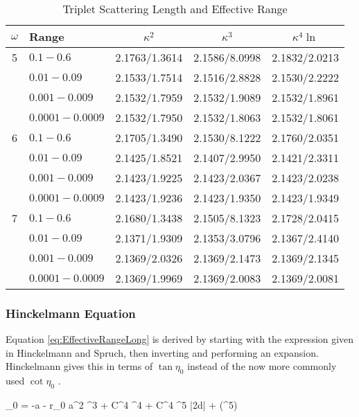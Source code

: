 \documentclass[Dissertation.tex]{subfiles}
\begin{document}
\begin{table}[H]
\centering
\begin{tabular}{c l c c c}
\toprule
$\omega$ & Range & $\kappa^2$ & $\kappa^3$ & $\kappa^4 \ln$ \\
\midrule
5 & $0.1 - 0.6$ & 2.1763/1.3614 & 2.1586/8.0998 & 2.1832/2.0213 \\
  & $0.01 - 0.09$ & 2.1533/1.7514 & 2.1516/2.8828 & 2.1530/2.2222 \\
  & $0.001 - 0.009$ & 2.1532/1.7959 & 2.1532/1.9089 & 2.1532/1.8961 \\
  & $0.0001 - 0.0009$ & 2.1532/1.7950 & 2.1532/1.8063 & 2.1532/1.8061 \\
\midrule
6 & $0.1 - 0.6$ & 2.1705/1.3490 & 2.1530/8.1222 & 2.1760/2.0351 \\
  & $0.01 - 0.09$ & 2.1425/1.8521 & 2.1407/2.9950 & 2.1421/2.3311 \\
  & $0.001 - 0.009$ & 2.1423/1.9225 & 2.1423/2.0367 & 2.1423/2.0238 \\
  & $0.0001 - 0.0009$ & 2.1423/1.9236 & 2.1423/1.9350 & 2.1423/1.9349 \\
\midrule
7 & $0.1 - 0.6$ & 2.1680/1.3438 & 2.1505/8.1323 & 2.1728/2.0415 \\
  & $0.01 - 0.09$ & 2.1371/1.9309 & 2.1353/3.0796 & 2.1367/2.4140 \\
  & $0.001 - 0.009$ & 2.1369/2.0326 & 2.1369/2.1473 & 2.1369/2.1345 \\
  & $0.0001 - 0.0009$ & 2.1369/1.9969 & 2.1369/2.0083 & 2.1369/2.0081 \\  
\bottomrule
\end{tabular}
\caption{Triplet Scattering Length and Effective Range}
\label{tab:ScatLenTriplet}
\end{table}
 



\subsubsection{Hinckelmann Equation}
Equation \ref{eq:EffectiveRangeLong} is derived by starting with the expression given in Hinckelmann and Spruch, then inverting and performing an expansion. Hinckelmann gives this in terms of $\tan\eta_0$ instead of the now more commonly used $\cot\eta_0$ \cite{Hinckelmann1971}.

\beq
\label{eq:HinckelmannEqn}
\tan\eta_0 = -a \kappa -  r_0 a^2 \kappa^3 +  C^4 \kappa^4 +  C^4 \kappa^5 \ln|2\kappa d| + (\kappa^5)
\eeq
\end{document}
